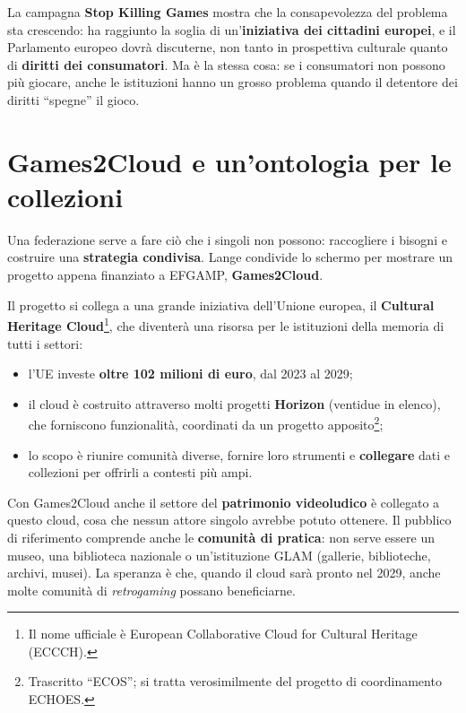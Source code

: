 La campagna \textbf{Stop Killing Games} mostra che la consapevolezza del problema
sta crescendo: ha raggiunto la soglia di un'\textbf{iniziativa dei cittadini
europei}, e il Parlamento europeo dovrà discuterne, non tanto in prospettiva
culturale quanto di \textbf{diritti dei consumatori}. Ma è la stessa cosa: se i
consumatori non possono più giocare, anche le istituzioni hanno un grosso
problema quando il detentore dei diritti ``spegne'' il gioco.

\section{Games2Cloud e un'ontologia per le collezioni}
\label{sec:c1-4-cloud}

Una federazione serve a fare ciò che i singoli non possono: raccogliere i
bisogni e costruire una \textbf{strategia condivisa}. Lange condivide lo schermo
per mostrare un progetto appena finanziato a EFGAMP, \textbf{Games2Cloud}.

Il progetto si collega a una grande iniziativa dell'Unione europea, il
\textbf{Cultural Heritage Cloud}\footnote{Il nome ufficiale è European
Collaborative Cloud for Cultural Heritage (ECCCH).}, che diventerà una risorsa
per le istituzioni della memoria di tutti i settori:
\begin{itemize}
  \item l'UE investe \textbf{oltre 102 milioni di euro}, dal 2023 al 2029;
  \item il cloud è costruito attraverso molti progetti \textbf{Horizon}
        (ventidue in elenco), che forniscono funzionalità, coordinati da un
        progetto apposito\footnote{Trascritto ``ECOS''; si tratta verosimilmente
        del progetto di coordinamento ECHOES.};
  \item lo scopo è riunire comunità diverse, fornire loro strumenti e
        \textbf{collegare} dati e collezioni per offrirli a contesti più ampi.
\end{itemize}
Con Games2Cloud anche il settore del \textbf{patrimonio videoludico} è collegato
a questo cloud, cosa che nessun attore singolo avrebbe potuto ottenere. Il
pubblico di riferimento comprende anche le \textbf{comunità di pratica}: non
serve essere un museo, una biblioteca nazionale o un'istituzione GLAM (gallerie,
biblioteche, archivi, musei). La speranza è che, quando il cloud sarà pronto nel
2029, anche molte comunità di \emph{retrogaming} possano beneficiarne.

